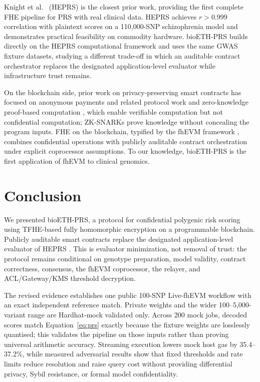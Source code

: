 \documentclass[10pt,twocolumn]{article}
\begin{document}
Knight et al.\ \citep{knight2026heprs} (HEPRS) is the closest prior work, providing
the first complete FHE pipeline for PRS with real clinical data.  HEPRS achieves
$r > 0.999$ correlation with plaintext scores on a 110,000-SNP schizophrenia
model and demonstrates practical feasibility on commodity hardware.  bioETH-PRS
builds directly on the HEPRS computational framework and uses the same GWAS fixture
datasets, studying a different trade-off in which an auditable contract orchestrator
replaces the designated application-level evaluator while infrastructure trust remains.

On the blockchain side, prior work on privacy-preserving smart contracts has
focused on anonymous payments and related protocol work
\citep{sasson2014zerocash,pertsev2019tornado} and
zero-knowledge proof-based computation \citep{ben2018starkware}, which enable
verifiable computation but not confidential computation; ZK-SNARKs prove knowledge
without concealing the program inputs.  FHE on the blockchain, typified by the fhEVM
framework \citep{zamafhevm}, combines confidential operations with publicly auditable
contract orchestration under explicit coprocessor assumptions.  To our knowledge, bioETH-PRS is the first application of fhEVM
to clinical genomics.

\section{Conclusion}
\label{sec:conclusion}

We presented bioETH-PRS, a protocol for confidential polygenic risk
scoring using TFHE-based fully homomorphic encryption on a programmable blockchain.
Publicly auditable smart contracts replace the designated application-level evaluator
of HEPRS \citep{knight2026heprs}.  This is evaluator minimization, not removal of trust:
the protocol remains conditional on genotype preparation, model validity, contract
correctness, consensus, the fhEVM coprocessor, the relayer, and ACL/Gateway/KMS
threshold decryption.

The revised evidence establishes one public 100-SNP Live-fhEVM workflow with an exact
independent reference match.  Private weights and the wider 100--5,000-variant range are
Hardhat-mock validated only.  Across 200 mock jobs, decoded scores match Equation~\ref{eq:prs}
exactly because the fixture weights are losslessly quantised; this validates the
pipeline on those inputs rather than proving universal arithmetic accuracy.  Streaming
execution lowers mock host gas by 35.4--37.2\%, while measured adversarial results show
that fixed thresholds and rate limits reduce resolution and raise query cost without
providing differential privacy, Sybil resistance, or formal model confidentiality.
\end{document}

